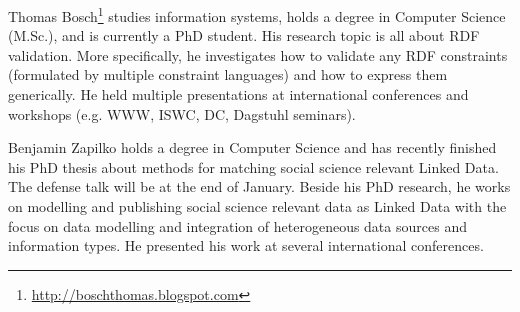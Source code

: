 \documentclass{llncs}
\begin{document}

Thomas Bosch\footnote{\url{http://boschthomas.blogspot.com}} studies information systems, holds a degree in Computer Science (M.Sc.), and is currently a PhD student.
His research topic is all about RDF validation.
More specifically, he investigates how to validate any RDF constraints (formulated by multiple constraint languages) and how to express them generically. 
He held multiple presentations at international conferences and workshops (e.g. WWW, ISWC, DC, Dagstuhl seminars). 

Benjamin Zapilko holds a degree in Computer Science and has recently finished his PhD thesis about methods for matching social science relevant Linked Data. The defense talk will be at the end of January. Beside his PhD research, he works on modelling and publishing social science relevant data as Linked Data with the focus on data modelling and integration of heterogeneous data sources and information types. He presented his work at several international conferences.

{}

\setcounter{tocdepth}{1}
\end{document}
